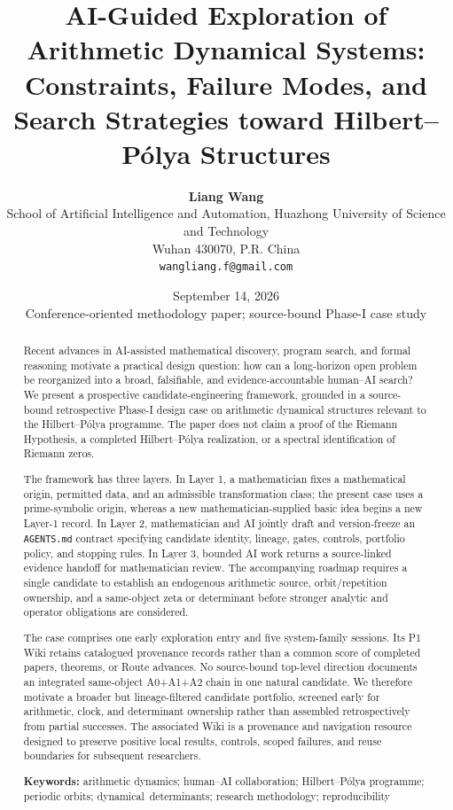 \documentclass[11pt,a4paper]{article}
\title{\textbf{AI-Guided Exploration of Arithmetic Dynamical Systems:}\\[0.25em]
\large Constraints, Failure Modes, and Search Strategies toward Hilbert--Pólya Structures}
\author{\textbf{Liang Wang}\\
\small School of Artificial Intelligence and Automation, Huazhong University of Science and Technology\\
\small Wuhan 430070, P.R. China\\
\small \texttt{wangliang.f@gmail.com}}
\date{\small September 14, 2026\\[-0.1em]
\footnotesize Conference-oriented methodology paper; source-bound Phase-I case study}
\begin{document}
\maketitle
\thispagestyle{plain}

\begin{abstract}
Recent advances in AI-assisted mathematical discovery, program search, and
formal reasoning motivate a practical design question: how can a long-horizon
open problem be reorganized into a broad, falsifiable, and evidence-accountable
human--AI search? We present a prospective candidate-engineering framework,
grounded in a source-bound retrospective Phase-I design case on arithmetic
dynamical structures relevant to the Hilbert--P\'olya programme. The paper does
not claim a proof of the Riemann Hypothesis, a completed Hilbert--P\'olya
realization, or a spectral identification of Riemann zeros.

The framework has three layers. In Layer 1, a mathematician fixes a
mathematical origin, permitted data, and an admissible transformation class;
the present case uses a prime-symbolic origin, whereas a new
mathematician-supplied basic idea begins a new Layer-1 record. In Layer 2,
mathematician and AI jointly
draft and version-freeze an \texttt{AGENTS.md} contract specifying candidate
identity, lineage, gates, controls, portfolio policy, and stopping rules. In
Layer 3, bounded AI work returns a source-linked evidence handoff for
mathematician review. The accompanying roadmap requires a single candidate to
establish an endogenous arithmetic source, orbit/repetition ownership, and a
same-object zeta or determinant before stronger analytic and operator
obligations are considered.

The case comprises one early exploration entry and five system-family sessions.
Its P1 Wiki retains catalogued provenance records rather than a common score of
completed papers, theorems, or Route advances. No source-bound top-level
direction documents an integrated same-object A0+A1+A2 chain in one natural
candidate. We therefore motivate a broader but lineage-filtered candidate
portfolio, screened early for arithmetic, clock, and determinant ownership
rather than assembled retrospectively from partial successes. The associated
Wiki is a provenance and navigation resource designed to preserve positive
local results, controls, scoped failures, and reuse boundaries for subsequent
researchers.

\smallskip
\noindent\textbf{Keywords:} arithmetic dynamics; human--AI collaboration; Hilbert--Pólya programme; periodic orbits; \mbox{dynamical determinants}; research methodology; reproducibility
\end{abstract}
\end{document}
